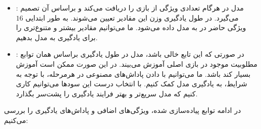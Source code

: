 \documentclass[12pt]{article}
\begin{document}
\begin{itemize}
    \item {}:
    مدل در هرگام تعدادی ویژگی از بازی را دریافت می‌کند و براساس
    آن تصمیم می‌گیرد. در طول یادگیری وزن این مقادیر تعیین می‌شوند. به طور ابتدایی $16$
    ویژگی حاضر در 
    به مدل داده می‌شود. ما می‌توانیم مقادیر بیشتر و متنوع‌تری را برای یادگیری به مدل بدهیم.

    \item {}:
    در صورتی که این تابع خالی باشد، مدل در طول یادگیری براساس همان توابع مطلوبیت
    موجود در بازی اصلی آموزش می‌بیند. در این صورت ممکن است آموزش بسیار کند باشد. ما می‌توانیم با 
    دادن پاداش‌های مصنوعی در هرمرحله، با توجه به شرایط، به یادگیری مدل کمک کنیم. با انتخاب
    درست این سودها می‌توانیم کاری کنیم که مدل سریع‌تر و بهتر فرایند یادگیری را پشت‌سر بگذارد.
\end{itemize}

در ادامه توابع پیاده‌سازی شده، ویژگی‌های اضافی و پاداش‌های یادگیری را بررسی می‌کنیم:
\end{document}

